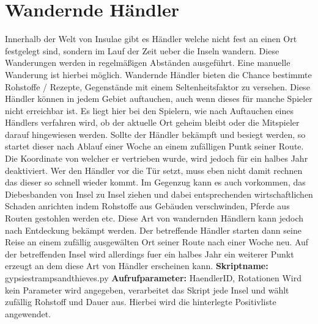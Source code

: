 \section {Wandernde H{\"a}ndler}
Innerhalb der Welt von Insulae gibt es H{\"a}ndler welche nicht fest an einen
Ort festgelegt sind, sondern im Lauf der Zeit ueber die Inseln wandern. Diese
Wanderungen werden in regelm{\"a}\ss igen Abst{\"a}nden ausgef{\"u}hrt. Eine
manuelle Wanderung ist hierbei m{\"o}glich.\newline\newline
Wandernde H{\"a}ndler bieten die Chance bestimmte Rohstoffe / Rezepte,
Gegenst{\"a}nde mit einem Seltenheitsfaktor zu versehen. Diese
H{\"a}ndler k{\"o}nnen in jedem Gebiet auftauchen, auch wenn
dieses f{\"u}r manche Spieler nicht erreichbar ist. Es liegt hier
bei den Spielern, wie nach Auftauchen eines H{\"a}ndlers
verfahren wird, ob der aktuelle Ort geheim bleibt oder die
Mitspieler darauf hingewiesen werden.\newline
Sollte der H{\"a}ndler bek{\"a}mpft und besiegt werden, so startet dieser nach
Ablauf einer Woche an einem zuf{\"a}lligen Puntk seiner Route. Die Koordinate
von welcher er vertrieben wurde, wird jedoch f{\"u}r ein halbes Jahr
deaktiviert. Wer den H{\"a}ndler vor die T{\"u}r setzt, muss eben nicht damit
rechnen das dieser so schnell wieder kommt.
\newline
Im Gegenzug kann es auch vorkommen, das Diebesbanden von Insel zu Insel ziehen
und dabei entsprechenden wirtschaftlichen Schaden anrichten indem Rohstoffe aus
Geb{\"a}uden verschwinden, Pferde aus Routen gestohlen werden etc.
Diese Art von wandernden H{\"a}ndlern kann jedoch nach
Entdeckung bek{\"a}mpt werden. Der betreffende H{\"a}ndler
starten dann seine Reise an einem zuf{\"a}llig ausgew{\"a}lten
Ort seiner Route nach einer Woche neu. Auf der betreffenden
Insel wird allerdings fuer ein halbes Jahr ein weiterer Punkt
erzeugt an dem diese Art von H{\"a}ndler erscheinen kann.\newline\newline
\textbf{Skriptname:}
gypsiestrampsandthieves.py
\newline\newline
\textbf{Aufrufparameter:} HaendlerID, Rotationen
\newline\newline Wird kein Parameter wird angegeben, verarbeitet das Skript jede Insel und w{\"a}hlt zuf{\"a}llig Rohstoff und Dauer aus. Hierbei wird die hinterlegte Positivliste angewendet.

